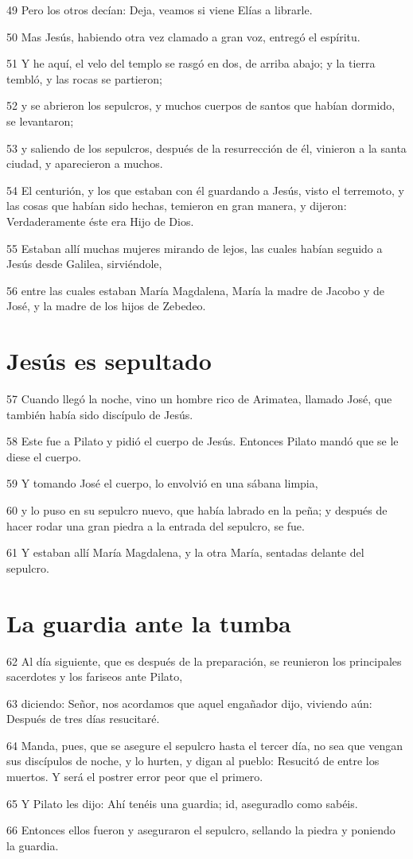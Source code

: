 \par 49 Pero los otros decían: Deja, veamos si viene Elías a librarle.
\par 50 Mas Jesús, habiendo otra vez clamado a gran voz, entregó el espíritu.
\par 51 Y he aquí, el velo del templo se rasgó en dos, de arriba abajo; y la tierra tembló, y las rocas se partieron;
\par 52 y se abrieron los sepulcros, y muchos cuerpos de santos que habían dormido, se levantaron;
\par 53 y saliendo de los sepulcros, después de la resurrección de él, vinieron a la santa ciudad, y aparecieron a muchos.
\par 54 El centurión, y los que estaban con él guardando a Jesús, visto el terremoto, y las cosas que habían sido hechas, temieron en gran manera, y dijeron: Verdaderamente éste era Hijo de Dios.
\par 55 Estaban allí muchas mujeres mirando de lejos, las cuales habían seguido a Jesús desde Galilea, sirviéndole,
\par 56 entre las cuales estaban María Magdalena, María la madre de Jacobo y de José, y la madre de los hijos de Zebedeo.

\section*{Jesús es sepultado}

\par 57 Cuando llegó la noche, vino un hombre rico de Arimatea, llamado José, que también había sido discípulo de Jesús.
\par 58 Este fue a Pilato y pidió el cuerpo de Jesús. Entonces Pilato mandó que se le diese el cuerpo.
\par 59 Y tomando José el cuerpo, lo envolvió en una sábana limpia,
\par 60 y lo puso en su sepulcro nuevo, que había labrado en la peña; y después de hacer rodar una gran piedra a la entrada del sepulcro, se fue.
\par 61 Y estaban allí María Magdalena, y la otra María, sentadas delante del sepulcro.

\section*{La guardia ante la tumba}

\par 62 Al día siguiente, que es después de la preparación, se reunieron los principales sacerdotes y los fariseos ante Pilato,
\par 63 diciendo: Señor, nos acordamos que aquel engañador dijo, viviendo aún: Después de tres días resucitaré.
\par 64 Manda, pues, que se asegure el sepulcro hasta el tercer día, no sea que vengan sus discípulos de noche, y lo hurten, y digan al pueblo: Resucitó de entre los muertos. Y será el postrer error peor que el primero.
\par 65 Y Pilato les dijo: Ahí tenéis una guardia; id, aseguradlo como sabéis.
\par 66 Entonces ellos fueron y aseguraron el sepulcro, sellando la piedra y poniendo la guardia.

